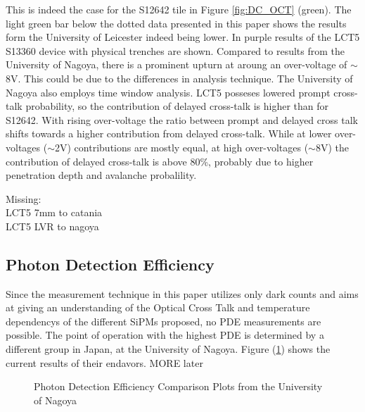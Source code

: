 \documentclass[12pt,article,type=msc,colorback,accentcolor=tud9c]{tudthesis}
\begin{document}
This is indeed the case for the S12642 tile in Figure \ref{fig:DC_OCT} (green). The light green bar below the dotted data presented in this paper shows the results form the University of Leicester indeed being lower. In purple results of the LCT5 S13360 device with physical trenches are shown. Compared to results from the University of Nagoya, there is a prominent upturn at aroung an over-voltage of $\sim$8V. This could be due to the differences in analysis technique. The University of Nagoya also employs time window analysis. LCT5 posseses lowered prompt cross-talk probability, so the contribution of delayed cross-talk is higher than for S12642. With rising over-voltage the ratio between prompt and delayed cross talk shifts towards a higher contribution from delayed cross-talk. While at lower over-voltages ($\sim$2V) contributions are mostly equal, at high over-voltages ($\sim$8V) the contribution of delayed cross-talk is above 80\%, probably due to higher penetration depth and avalanche probalility.


Missing:\\
LCT5 7mm to catania\\
LCT5 LVR to nagoya\\



\subsection{Photon Detection Efficiency}

Since the measurement technique in this paper utilizes only dark counts and aims at giving an understanding of the Optical Cross Talk and temperature dependencys of the different SiPMs proposed, no PDE measurements are possible. The point of operation with the highest PDE is determined by a different group in Japan, at the University of Nagoya. Figure (\ref{fig:Nagoya_PDE}) shows the current results of their endavors. MORE later


\begin{figure}[h]
\begin{centering}
\caption{Photon Detection Efficiency Comparison Plots from the University of Nagoya}
\label{fig:Nagoya_PDE}
\end{centering}
\end{figure}
\end{document}
